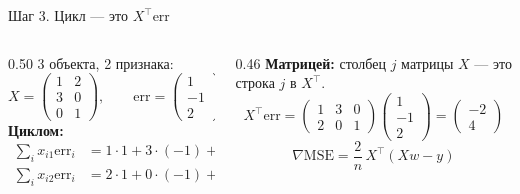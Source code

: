 \begin{frame}[c]{Шаг 3. Цикл --- это $X^\top \mathrm{err}$}
  \begin{columns}[T]
    \begin{column}{0.50\textwidth}
      \small
      3 объекта, 2 признака:
      \[X = \begin{pmatrix} 1 & 2\\ 3 & 0\\ 0 & 1\end{pmatrix},\qquad
        \mathrm{err} = \begin{pmatrix} 1\\ -1\\ 2\end{pmatrix}\]
      \textbf{Циклом:}
      \begin{align*}
        \textstyle\sum_i x_{i1}\mathrm{err}_i &= 1\cdot1 + 3\cdot(-1) + 0\cdot2 = -2\\
        \textstyle\sum_i x_{i2}\mathrm{err}_i &= 2\cdot1 + 0\cdot(-1) + 1\cdot2 = 4
      \end{align*}
    \end{column}
    \begin{column}{0.46\textwidth}
      \small
      \textbf{Матрицей:} столбец $j$ матрицы $X$ --- это строка $j$ в $X^\top$.
      \[X^\top \mathrm{err} =
        \begin{pmatrix} 1 & 3 & 0\\ 2 & 0 & 1\end{pmatrix}
        \begin{pmatrix} 1\\ -1\\ 2\end{pmatrix} =
        \begin{pmatrix} -2\\ 4\end{pmatrix}\]
      \[\nabla \mathrm{MSE} = \frac{2}{n}\,X^\top (Xw - y)\]
    \end{column}
  \end{columns}
\end{frame}

